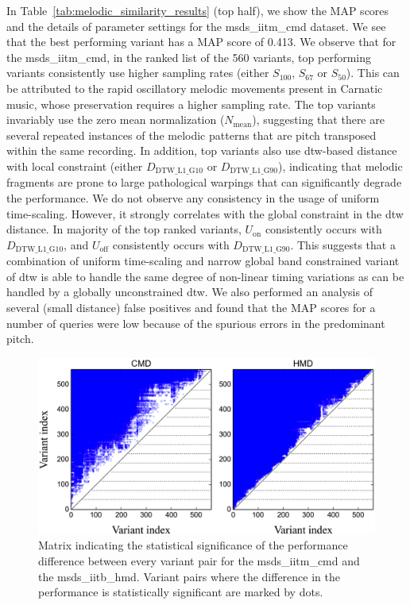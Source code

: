 In Table~\ref{tab:melodic_similarity_results} (top half), we show the MAP scores and the details of parameter settings for the \acrshort{msds_iitm_cmd} dataset. We see that the best performing variant has a MAP score of 0.413. We observe that for the \acrshort{msds_iitm_cmd}, in the ranked list of the 560 variants, top performing variants consistently use higher sampling rates (either  $S_{100}$, $S_{67}$ or $S_{50}$). This can be attributed to the rapid oscillatory melodic movements present in Carnatic music, whose preservation requires a higher sampling rate. The top variants invariably use the zero mean normalization ($N_{\mathrm{mean}}$), suggesting that there are several repeated instances of the melodic patterns that are pitch transposed within the same recording. In addition, top variants also use \gls{dtw}-based distance with local constraint (either $D_{\mathrm{DTW\_L1\_G10}}$ or $D_{\mathrm{DTW\_L1\_G90}}$), indicating that melodic fragments are prone to large pathological warpings that can significantly degrade the performance. We do not observe any consistency in the usage of uniform time-scaling. However, it strongly correlates with the global constraint in the \gls{dtw} distance. In majority of the top ranked variants, $U_{\mathrm{on}}$ consistently occurs with $D_{\mathrm{DTW\_L1\_G10}}$, and $U_{\mathrm{off}}$ consistently occurs with $D_{\mathrm{DTW\_L1\_G90}}$. This suggests that a combination of uniform time-scaling and narrow global band constrained variant of \gls{dtw} is able to handle the same degree of non-linear timing variations as can be handled by a globally unconstrained \gls{dtw}. We also performed an analysis of several (small distance) false positives and found that the MAP scores for a number of queries were low because of the spurious errors in the predominant pitch.


\begin{figure}
	\begin{center}
		\includegraphics[width=\figSizeEightyFive]{ch06_patterns/figures/SimilarityEvaluation/StatisticalDiff.png}
	\end{center}
	\caption{Matrix indicating the statistical significance of the performance difference between every variant pair for the \acrshort{msds_iitm_cmd} and the \acrshort{msds_iitb_hmd}. Variant pairs where the difference in the performance is statistically significant are marked by dots.}
	\label{fig:patterns_statistical_significance_similarity_evaluation}
\end{figure}


